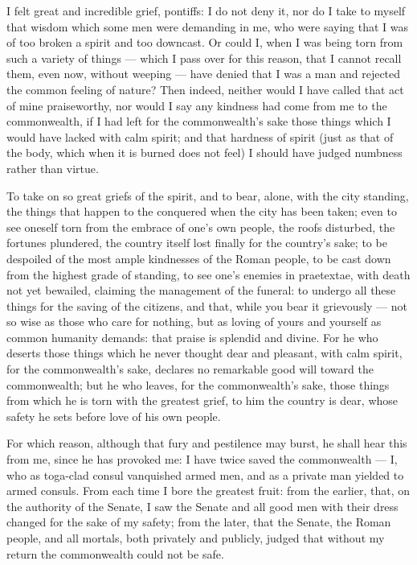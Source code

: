  I felt great and incredible grief, pontiffs: I do not deny it, nor do I take to myself that wisdom which some men were demanding in me, who were saying that I was of too broken a spirit and too downcast. Or could I, when I was being torn from such a variety of things --- which I pass over for this reason, that I cannot recall them, even now, without weeping --- have denied that I was a man and rejected the common feeling of nature? Then indeed, neither would I have called that act of mine praiseworthy, nor would I say any kindness had come from me to the commonwealth, if I had left for the commonwealth's sake those things which I would have lacked with calm spirit; and that hardness of spirit (just as that of the body, which when it is burned does not feel) I should have judged numbness rather than virtue.

 To take on so great griefs of the spirit, and to bear, alone, with the city standing, the things that happen to the conquered when the city has been taken; even to see oneself torn from the embrace of one's own people, the roofs disturbed, the fortunes plundered, the country itself lost finally for the country's sake; to be despoiled of the most ample kindnesses of the Roman people, to be cast down from the highest grade of standing, to see one's enemies in praetextae, with death not yet bewailed, claiming the management of the funeral: to undergo all these things for the saving of the citizens, and that, while you bear it grievously --- not so wise as those who care for nothing, but as loving of yours and yourself as common humanity demands: that praise is splendid and divine. For he who deserts those things which he never thought dear and pleasant, with calm spirit, for the commonwealth's sake, declares no remarkable good will toward the commonwealth; but he who leaves, for the commonwealth's sake, those things from which he is torn with the greatest grief, to him the country is dear, whose safety he sets before love of his own people.

 For which reason, although that fury and pestilence may burst, he shall hear this from me, since he has provoked me: I have twice saved the commonwealth --- I, who as toga-clad consul vanquished armed men, and as a private man yielded to armed consuls. From each time I bore the greatest fruit: from the earlier, that, on the authority of the Senate, I saw the Senate and all good men with their dress changed for the sake of my safety; from the later, that the Senate, the Roman people, and all mortals, both privately and publicly, judged that without my return the commonwealth could not be safe.

